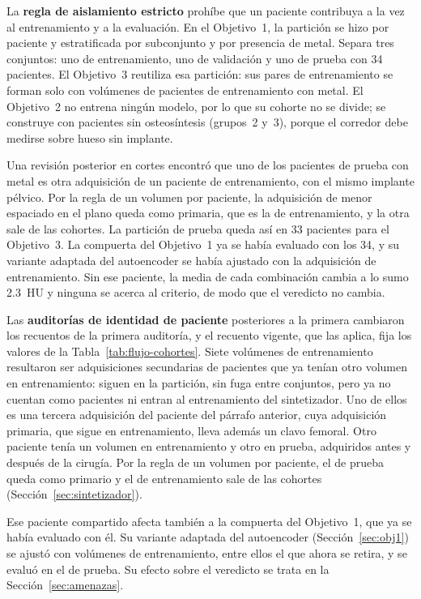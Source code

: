 La \textbf{regla de aislamiento estricto} prohíbe que un paciente contribuya a la vez al entrenamiento y a la evaluación. En el Objetivo~1, la partición se hizo por paciente y estratificada por subconjunto y por presencia de metal. Separa tres conjuntos: uno de entrenamiento, uno de validación y uno de prueba con 34 pacientes. El Objetivo~3 reutiliza esa partición: sus pares de entrenamiento se forman solo con volúmenes de pacientes de entrenamiento con metal. El Objetivo~2 no entrena ningún modelo, por lo que su cohorte no se divide; se construye con pacientes sin osteosíntesis (grupos~2 y~3), porque el corredor debe medirse sobre hueso sin implante.

Una revisión posterior en cortes encontró que uno de los pacientes de prueba con metal es otra adquisición de un paciente de entrenamiento, con el mismo implante pélvico. Por la regla de un volumen por paciente, la adquisición de menor espaciado en el plano queda como primaria, que es la de entrenamiento, y la otra sale de las cohortes. La partición de prueba queda así en 33 pacientes para el Objetivo~3. La compuerta del Objetivo~1 ya se había evaluado con los 34, y su variante adaptada del autoencoder se había ajustado con la adquisición de entrenamiento. Sin ese paciente, la media de cada combinación cambia a lo sumo 2.3~HU y ninguna se acerca al criterio, de modo que el veredicto no cambia.

Las \textbf{auditorías de identidad de paciente} posteriores a la primera cambiaron los recuentos de la primera auditoría, y el recuento vigente, que las aplica, fija los valores de la Tabla~\ref{tab:flujo-cohortes}. Siete volúmenes de entrenamiento resultaron ser adquisiciones secundarias de pacientes que ya tenían otro volumen en entrenamiento: siguen en la partición, sin fuga entre conjuntos, pero ya no cuentan como pacientes ni entran al entrenamiento del sintetizador. Uno de ellos es una tercera adquisición del paciente del párrafo anterior, cuya adquisición primaria, que sigue en entrenamiento, lleva además un clavo femoral. Otro paciente tenía un volumen en entrenamiento y otro en prueba, adquiridos antes y después de la cirugía. Por la regla de un volumen por paciente, el de prueba queda como primario y el de entrenamiento sale de las cohortes (Sección~\ref{sec:sintetizador}).

Ese paciente compartido afecta también a la compuerta del Objetivo~1, que ya se había evaluado con él. Su variante adaptada del autoencoder (Sección~\ref{sec:obj1}) se ajustó con volúmenes de entrenamiento, entre ellos el que ahora se retira, y se evaluó en el de prueba. Su efecto sobre el veredicto se trata en la Sección~\ref{sec:amenazas}.

